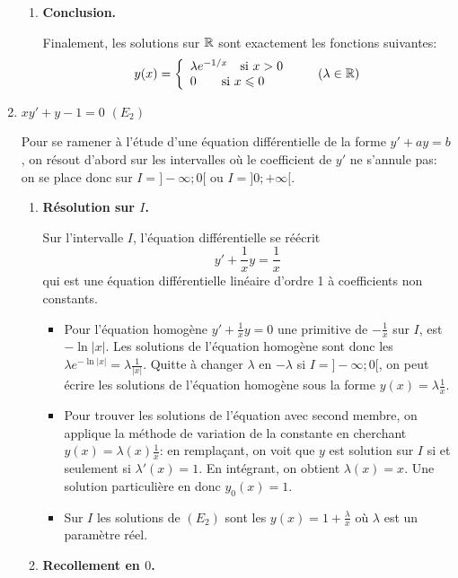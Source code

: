 \documentclass[11pt,a4paper]{article}
\renewcommand{\le}{\leqslant} \renewcommand{\leq}{\leqslant}
\begin{document}
\begin{enumerate}
\begin{enumerate}
  \item \textbf{Conclusion.}
  
Finalement, les solutions sur $\mathbb{R}$ sont exactement les fonctions suivantes: 
$$y(x)=\left\lbrace\begin{array}{l}
\lambda e^{-1/x}\quad \text{si}\ x>0\\
0\qquad \text{si}\ x\le 0
\end{array}\right. \qquad (\lambda\in\R)$$
  \end{enumerate}

\item $xy'+y-1 = 0$ $(E_2)$

Pour se ramener à l'étude d'une équation différentielle de la forme 
$y'+ay=b$, on résout d'abord sur les intervalles où le coefficient 
de $y'$ ne s'annule pas: on se place donc sur $I=]-\infty;0[$ ou $I=]0;+\infty[$.

  \begin{enumerate}
  \item \textbf{Résolution sur $I$.}
  
  Sur l'intervalle $I$, l'équation différentielle se réécrit 
$$y'+\frac{1}{x}y=\frac{1}{x}$$ 
qui est une équation différentielle linéaire d'ordre 1 à 
coefficients non constants.

  \begin{itemize}
    \item Pour l'équation homogène $y'+\frac{1}{x}y=0$
 une primitive de $-\frac{1}{x}$ sur $I$, est $-\ln|x|$.
Les solutions de l'équation homogène sont donc les $\lambda e^{-\ln|x|}=\lambda\frac{1}{|x|}$. 
Quitte à changer $\lambda$ en $-\lambda$ si $I=]-\infty;0[$, on peut écrire les solutions de 
l'équation homogène sous la forme $y(x)=\lambda \frac1x$.
    
    \item Pour trouver les solutions de 
l'équation avec second membre, on applique la méthode de variation de la constante 
en cherchant $y(x)=\lambda(x) \frac 1x$: en remplaçant, on voit que $y$ est solution sur $I$ 
si et seulement si $\lambda'(x)=1$. En intégrant, on obtient $\lambda(x)=x$. 
Une solution particulière en donc $y_0(x) = 1$.
    
    \item Sur $I$ les solutions de $(E_2)$ sont les $y(x)=1+\frac{\lambda}{x}$ où $\lambda$ est un paramètre réel.
  \end{itemize}

 
  \item \textbf{Recollement en $0$.}
  

\end{enumerate}
\end{enumerate}
\end{document}
